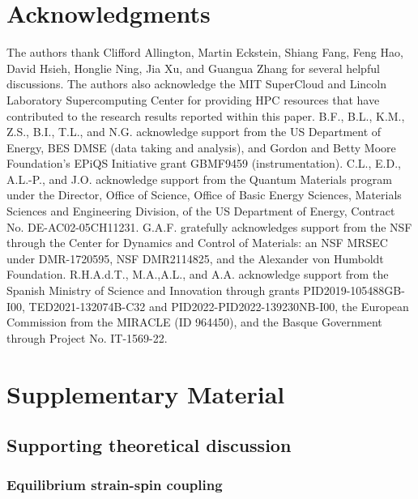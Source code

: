 \section{Acknowledgments}

The authors thank Clifford Allington, Martin Eckstein, Shiang Fang, Feng Hao, David Hsieh, Honglie Ning, Jia Xu, and Guangua Zhang for several helpful discussions.
The authors also acknowledge the MIT SuperCloud and Lincoln Laboratory Supercomputing Center for providing HPC resources that have contributed to the research results reported within this paper.
B.F., B.L., K.M., Z.S., B.I., T.L., and N.G. acknowledge support from the US Department of Energy, BES DMSE (data taking and analysis), and Gordon and Betty Moore Foundation’s EPiQS Initiative grant GBMF9459 (instrumentation).
C.L., E.D., A.L.-P., and J.O. acknowledge support from the Quantum Materials program under the Director, Office of Science, Office of Basic Energy Sciences, Materials Sciences and Engineering Division, of the US Department of Energy, Contract No. DE-AC02-05CH11231.
G.A.F. gratefully acknowledges support from the NSF through the Center for Dynamics and Control of Materials: an NSF MRSEC under DMR-1720595, NSF DMR2114825, and the Alexander von Humboldt Foundation.
R.H.A.d.T., M.A.,A.L., and A.A. acknowledge support from the Spanish Ministry of Science and Innovation through grants PID2019-105488GB-I00, TED2021-132074B-C32 and PID2022-PID2022-139230NB-I00, the European Commission from the MIRACLE (ID 964450), and the Basque Government through Project No. IT-1569-22.

\section{Supplementary Material}

\subsection{Supporting theoretical discussion}

\subsubsection{Equilibrium strain-spin coupling}\label{sec:equilibriumtheory}

